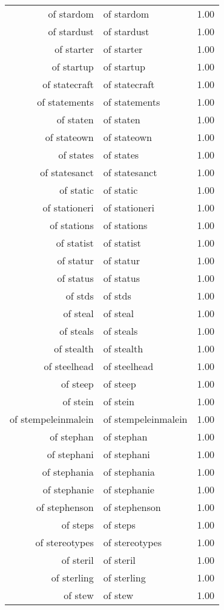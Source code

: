 \begin{table}[ht]
\begin{tabular}{rlr}
  of stardom & of stardom & 1.00 \\ 
  of stardust & of stardust & 1.00 \\ 
  of starter & of starter & 1.00 \\ 
  of startup & of startup & 1.00 \\ 
  of statecraft & of statecraft & 1.00 \\ 
  of statements & of statements & 1.00 \\ 
  of staten & of staten & 1.00 \\ 
  of stateown & of stateown & 1.00 \\ 
  of states & of states & 1.00 \\ 
  of statesanct & of statesanct & 1.00 \\ 
  of static & of static & 1.00 \\ 
  of stationeri & of stationeri & 1.00 \\ 
  of stations & of stations & 1.00 \\ 
  of statist & of statist & 1.00 \\ 
  of statur & of statur & 1.00 \\ 
  of status & of status & 1.00 \\ 
  of stds & of stds & 1.00 \\ 
  of steal & of steal & 1.00 \\ 
  of steals & of steals & 1.00 \\ 
  of stealth & of stealth & 1.00 \\ 
  of steelhead & of steelhead & 1.00 \\ 
  of steep & of steep & 1.00 \\ 
  of stein & of stein & 1.00 \\ 
  of stempeleinmalein & of stempeleinmalein & 1.00 \\ 
  of stephan & of stephan & 1.00 \\ 
  of stephani & of stephani & 1.00 \\ 
  of stephania & of stephania & 1.00 \\ 
  of stephanie & of stephanie & 1.00 \\ 
  of stephenson & of stephenson & 1.00 \\ 
  of steps & of steps & 1.00 \\ 
  of stereotypes & of stereotypes & 1.00 \\ 
  of steril & of steril & 1.00 \\ 
  of sterling & of sterling & 1.00 \\ 
  of stew & of stew & 1.00 \\ 

\end{tabular}
\end{table}
